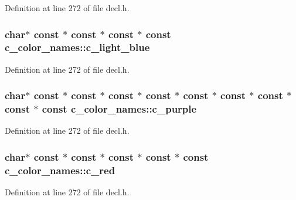 Definition at line 272 of file decl.\+h.

\hypertarget{structc__color__names_a8bb4aae535671760cd53d454b8f1b91e}{
\subsubsection[{c\+\_\+light\+\_\+blue}]{ char$\ast$ {\bf const} $\ast$ {\bf const} $\ast$ {\bf const} $\ast$ {\bf const} c\+\_\+color\+\_\+names\+::c\+\_\+light\+\_\+blue}}\label{structc__color__names_a8bb4aae535671760cd53d454b8f1b91e}


Definition at line 272 of file decl.\+h.

\hypertarget{structc__color__names_a67c3d57a3672c8c1b0f0224442df81c4}{
\subsubsection[{c\+\_\+purple}]{ char$\ast$ {\bf const} $\ast$ {\bf const} $\ast$ {\bf const} $\ast$ {\bf const} $\ast$ {\bf const} $\ast$ {\bf const} $\ast$ {\bf const} $\ast$ {\bf const} $\ast$ {\bf const} c\+\_\+color\+\_\+names\+::c\+\_\+purple}}\label{structc__color__names_a67c3d57a3672c8c1b0f0224442df81c4}


Definition at line 272 of file decl.\+h.

\hypertarget{structc__color__names_a45e68ca7dc7d0955d16735ccb49fbdff}{
\subsubsection[{c\+\_\+red}]{ char$\ast$ {\bf const} $\ast$ {\bf const} $\ast$ {\bf const} $\ast$ {\bf const} $\ast$ {\bf const} c\+\_\+color\+\_\+names\+::c\+\_\+red}}\label{structc__color__names_a45e68ca7dc7d0955d16735ccb49fbdff}


Definition at line 272 of file decl.\+h.

